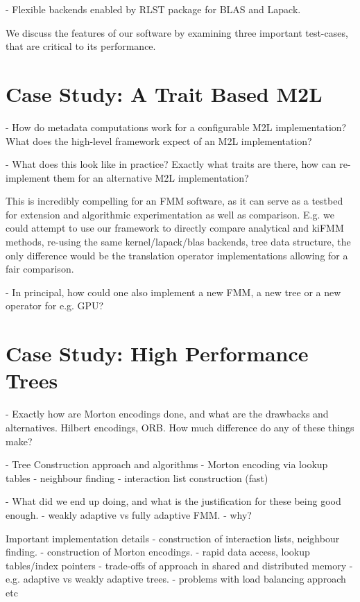 - Flexible backends enabled by RLST package for BLAS and Lapack.

We discuss the features of our software by examining three important test-cases, that are critical to its performance.

\section{Case Study: A Trait Based M2L}\label{chpt:software_design:sec:m2l}

- How do metadata computations work for a configurable M2L implementation? What does the high-level framework expect of an M2L implementation?

- What does this look like in practice? Exactly what traits are there, how can re-implement them for an alternative M2L implementation?

This is incredibly compelling for an FMM software, as it can serve as a testbed for extension and algorithmic experimentation as well as comparison. E.g. we could attempt to use our framework to directly compare analytical and kiFMM methods, re-using the same kernel/lapack/blas backends, tree data structure, the only difference would be the translation operator implementations allowing for a fair comparison.

- In principal, how could one also implement a new FMM, a new tree or a new operator for e.g. GPU?

\section{Case Study: High Performance Trees}\label{chpt:software_design:sec:trees}

- Exactly how are Morton encodings done, and what are the drawbacks and alternatives. Hilbert encodings, ORB. How much difference do any of these things make?

- Tree Construction approach and algorithms
    - Morton encoding via lookup tables
    - neighbour finding
    - interaction list construction (fast)

- What did we end up doing, and what is the justification for these being good enough.
    - weakly adaptive vs fully adaptive FMM.
    - why?

Important implementation details
    - construction of interaction lists, neighbour finding.
    - construction of Morton encodings.
    - rapid data access, lookup tables/index pointers
    - trade-offs of approach in shared and distributed memory
        - e.g. adaptive vs weakly adaptive trees.
        - problems with load balancing approach etc

